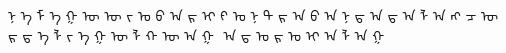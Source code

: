 ᠨ ᠡ ᠮ ᠡ ᠭ ᠦ ᠦ   ᠵ ᠣ ᠪ ᠠ ᠷ ᠢ   ᠻ ᠣ ᠨ ᠲ ᠷ ᠠ ᠪ ᠠ ᠨ ᠳ ᠠ   ᠳ ᠠ ᠯ ᠠ ᠩ   ᠴ ᠦ ᠷ ᠳ ᠡ ᠯ ᠵ ᠡ ᠭ ᠦ ᠯ ᠬ ᠦ   ᠠ ᠭ ᠎ ᠠ   ᠳ ᠣ ᠷ ᠣ ᠢ   ᠠ ᠯ ᠠ ᠭ